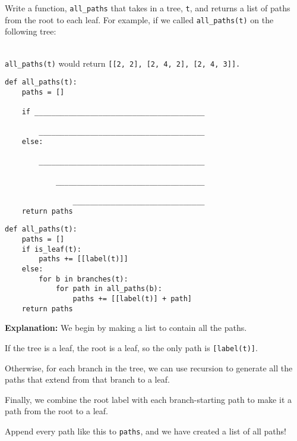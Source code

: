 \begin{blocksection}
\question Write a function, \lstinline$all_paths$ that takes in a tree, \lstinline$t$, and returns a list of paths from the root to each leaf.
For example, if we called \lstinline$all_paths(t)$ on the following tree:

\\\lstinline$all_paths(t)$ would return \lstinline$[[2, 2], [2, 4, 2], [2, 4, 3]].$
\newline

\begin{lstlisting}
def all_paths(t):
    paths = []

    if ________________________________________

        _______________________________________
    else:

        _______________________________________

            ___________________________________
            
                _______________________________
    return paths
\end{lstlisting}

\begin{solution}
\begin{lstlisting}
def all_paths(t):
    paths = []
    if is_leaf(t):
        paths += [[label(t)]]
    else:
        for b in branches(t):
            for path in all_paths(b):
                paths += [[label(t)] + path]
    return paths
\end{lstlisting}
\end{solution}
\end{blocksection}

\begin{solution}
    \textbf{Explanation:}
    We begin by making a list to contain all the paths.
    
    If the tree is a leaf, the root is a leaf, so the only path is \lstinline{[label(t)]}.
    
    Otherwise, for each branch in the tree, we can use recursion to generate all the paths that extend from that branch to a leaf.
    
    Finally, we combine the root label with each branch-starting path to make it a path from the root to a leaf.
    
    Append every path like this to \lstinline{paths}, and we have created a list of all paths!
\end{solution}

